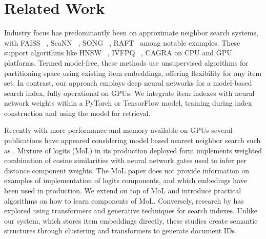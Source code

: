\section{Related Work}\label{sec:related_work}

Industry focus has predominantly been on approximate neighbor search systems, with FAISS ~\cite{FAISS_paper}, ScaNN ~\cite{scann_google_paper}, SONG ~\cite{song_paper}, RAFT~\cite{RAFT_paper} among notable examples. These support algorithms like HNSW ~\cite{hnsw_paper}, IVFPQ ~\cite{pq_paper}, CAGRA \cite{ootomo2023cagra} on CPU and GPU platforms. Termed model-free, these methods use unsupervised algorithms for partitioning space using existing item embeddings, offering flexibility for any item set. In contrast, our approach employs deep neural networks for a model-based search index, fully operational on GPUs. We integrate item indexes with neural network weights within a PyTorch or TensorFlow model, training during index construction and using the model for retrieval.

Recently with more performance and memory available on GPUs several publications have appeared considering model based nearest neighbor search such as \cite{MoL_paper, tay2022transformer, rajput2023recommender, zhang2023modelenhanced}. Mixture of logits (MoL) \cite{MoL_paper} in its production deployed form implements weighted combination of cosine similarities with neural network gates used to infer per distance component weights. The MoL paper does not provide information on examples of implementation of logits components, and which embedings have been used in production. We extend on top of MoL and introduce practical algorithms on how to learn components of MoL. 
Conversely, research by \cite{tay2022transformer, rajput2023recommender, zhang2023modelenhanced} has explored using transformers and generative techniques for search indexes. Unlike our system, which stores item embeddings directly, these studies create semantic structures through clustering and transformers to generate document IDs.

